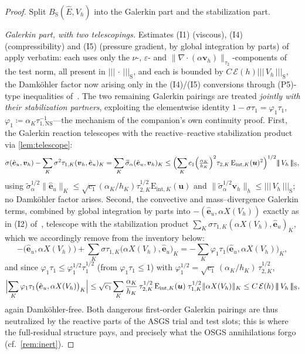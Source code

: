 \documentclass[11pt]{article}
\theoremstyle{remark}
\newcommand{\bu}{\boldsymbol{u}}
\newcommand{\bv}{\boldsymbol{v}}
\newcommand{\norm}[1]{\lVert #1 \rVert}
\newcommand{\normK}[1]{\lVert #1 \rVert_{K}}
\newcommand{\tnorm}[1]{\lvert\!\lvert\!\lvert\, #1 \,\rvert\!\rvert\!\rvert}
\newcommand{\tns}{\tau_{1,\mathrm{NS}}}
\newcommand{\Eint}[2]{\mathrm{E}_{\mathrm{int},#1}(#2)}
\newcommand{\st}{\widetilde{\sigma}_\alpha}
\newcommand{\Bs}{B_{\mathrm{S}}}
\newcommand{\EF}{\mathcal{E}}
\begin{document}
\begin{proof}
Split $\Bs(\hat E, V_h)$ into the Galerkin part and the stabilization part.

\smallskip\noindent\emph{Galerkin part, with two telescopings.}
Estimates (I1) (viscous), (I4) (compressibility) and (I5) (pressure gradient, by
global integration by parts) of~\cite[Lemma~6.2]{OSGSnote} apply verbatim: each uses
only the $\nu$-, $\varepsilon$- and
$\norm{\nabla\cdot(\alpha\bv_h)}_{\tau_2}$-components of the test norm, all present
in $\tnorm{\cdot}_{\mathrm{S}}$, and each is bounded by
$C\,\EF(h)\tnorm{V_h}_{\mathrm{S}}$, the Damk\"ohler factor now arising only in the
(I4)/(I5) conversions through (P5)-type inequalities of~\cite[Lemma~4.1]{OSGSnote}. The two remaining
Galerkin pairings are treated \emph{jointly with their stabilization partners},
exploiting the elementwise identity $1-\sigma\tau_1 = \varphi_1\tau_1$,
$\varphi_1 \coloneqq \alpha_K\tns^{-1}$---the mechanism of the companion's own
continuity proof. First, the Galerkin reaction telescopes with the
reactive--reactive stabilization product via \cref{lem:telescope}:
\[
  \sigma(\hat{\boldsymbol e}_u, \bv_h)
  - \sum_K \sigma^2\tau_{1,K}(\bv_h, \hat{\boldsymbol e}_u)_K
  = \sum_K \st(\hat{\boldsymbol e}_u, \bv_h)_K
  \le \Bigl( \sum_K c_1 \Bigl(\tfrac{\alpha_K}{h_K}\Bigr)^2
  \tau_{2,K}\,\Eint{K}{\bu}^2 \Bigr)^{1/2} \tnorm{V_h}_{\mathrm{S}},
\]
using $\st^{1/2}\normK{\hat{\boldsymbol e}_u} \le
\sqrt{c_1}(\alpha_K/h_K)\tau_{2,K}^{1/2}\Eint{K}{\bu}$ and
$\norm{\st^{1/2}\bv_h}_h \le \tnorm{V_h}_{\mathrm{S}}$; no Damk\"ohler factor
arises. Second, the convective and mass--divergence Galerkin terms, combined by
global integration by parts into $-(\hat{\boldsymbol e}_u, \alpha X(V_h))$ exactly
as in (I2) of~\cite{OSGSnote}, telescope with the stabilization product
$\sum_K \sigma\tau_{1,K}(\alpha X(V_h), \hat{\boldsymbol e}_u)_K$, which we
accordingly remove from the inventory below:
\[
  -\bigl(\hat{\boldsymbol e}_u, \alpha X(V_h)\bigr)
  + \sum_K \sigma\tau_{1,K}\bigl(\alpha X(V_h), \hat{\boldsymbol e}_u\bigr)_K
  = -\sum_K \varphi_1\tau_1\bigl(\hat{\boldsymbol e}_u, \alpha X(V_h)\bigr)_K,
\]
and since $\varphi_1\tau_1 \le \varphi_1^{1/2}\tau_1^{1/2}$ (from
$\varphi_1\tau_1 \le 1$) with $\varphi_1^{1/2} =
\sqrt{c_1}\,(\alpha_K/h_K)\,\tau_{2,K}^{1/2}$,
\[
  \Bigl| \sum_K \varphi_1\tau_1\bigl(\hat{\boldsymbol e}_u,
  \alpha X(V_h)\bigr)_K \Bigr|
  \le \sqrt{c_1}\sum_K \frac{\alpha_K}{h_K}\,\tau_{2,K}^{1/2}\,\Eint{K}{\bu}\;
  \tau_{1,K}^{1/2}\normK{\alpha X(V_h)}
  \le C\,\EF(h)\,\tnorm{V_h}_{\mathrm{S}},
\]
again Damk\"ohler-free. Both dangerous first-order Galerkin pairings are thus
neutralized by the reactive parts of the ASGS trial and test slots; this is where
the full-residual structure pays, and precisely what the OSGS annihilations forgo
(cf.\ \cref{rem:inert}).


\end{proof}
\end{document}
